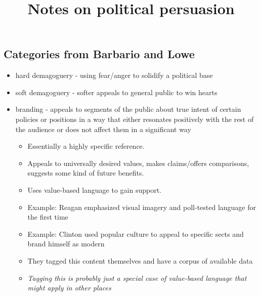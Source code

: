 \documentclass[letterpaper]{article}
\title{Notes on political persuasion}
\begin{document}
\maketitle

\subsection{Categories from Barbario and Lowe}
\begin{itemize}
	\item hard demagoguery - using fear/anger to solidify a political base
	\item soft demagoguery - softer appeals to general public to win hearts
	\item branding - appeals to segments of the public about true intent of certain policies or positions in a way that either resonates positively with the rest of the audience or does not affect them in a significant way
	\begin{itemize}
		\item Essentially a highly specific reference.
		\item Appeals to universally desired values, makes claims/offers comparisons, suggests some kind of future benefits.
		\item Uses value-based language to gain support.
		\item Example: Reagan emphasized visual imagery and poll-tested language for the first time
		\item Example: Clinton used popular culture to appeal to specific sects and brand himself as modern
		\item They tagged this content themselves and have a corpus of available data
		\item \emph{Tagging this is probably just a special case of value-based language that might apply in other places}
	\end{itemize}
\end{itemize}
\end{document}
